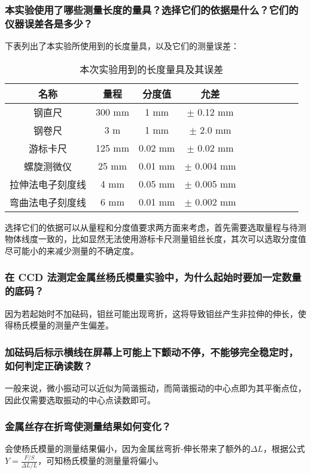 \documentclass[11pt]{article}
\begin{document}
	\subsubsection{本实验使用了哪些测量长度的量具？选择它们的依据是什么？它们的仪器误差各是多少？}
	下表列出了本实验所使用到的长度量具，以及它们的测量误差：
	\begin{table}[H]\centering
		\caption{本次实验用到的长度量具及其误差}
		\label{本次实验用到的长度量具及其误差}
		\begin{tabular}{cccccccccc}\toprule
			名称 & 量程 & 分度值 & 允差  \\
			\midrule
			钢直尺 & 300 mm & 1 mm & $\pm$ 0.12 mm \\
			钢卷尺 & 3 m & 1 mm & $\pm$ 2.0 mm \\
			游标卡尺 & 125 mm & 0.02 mm & $\pm$ 0.02 mm \\
			螺旋测微仪 & 25 mm & 0.01 mm & $\pm$ 0.004 mm \\
			拉伸法电子刻度线 & 4 mm & 0.05 mm & $\pm$ 0.005 mm \\
			弯曲法电子刻度线 & 6 mm & 0.01 mm  & $\pm$ 0.002 mm  \\
			\bottomrule
		\end{tabular}
	\end{table}
	
	选择它们的依据可以从量程和分度值要求两方面来考虑，首先需要选取量程与待测物体线度一致的，比如显然无法使用游标卡尺测量钼丝长度，其次可以选取分度值尽可能小的来减少测量的不确定度。
	
	\subsubsection{在 CCD 法测定金属丝杨氏模量实验中，为什么起始时要加一定数量的底码？}
	因为若起始时不加砝码，钼丝可能出现弯折，这将导致钼丝产生非拉伸的伸长，使得杨氏模量的测量产生偏差。
	
	\subsubsection{加砝码后标示横线在屏幕上可能上下颤动不停，不能够完全稳定时，如何判定正确读数？}
	一般来说，微小振动可以近似为简谐振动，而简谐振动的中心点即为其平衡点位，因此仅需要选取振动的中心点读数即可。
	
	\subsubsection{金属丝存在折弯使测量结果如何变化？}
	会使杨氏模量的测量结果偏小，因为金属丝弯折-伸长带来了额外的$\Delta L$，根据公式$Y=\frac{F/S}{\Delta L/L}$，可知杨氏模量的测量量将偏小。
	
\end{document}
